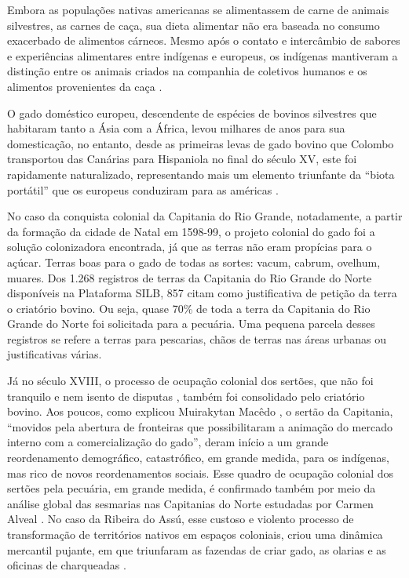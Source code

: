 \begin{refsection}
Embora as populações nativas americanas se alimentassem de carne de animais silvestres, as carnes de caça, sua dieta alimentar não era baseada no consumo exacerbado de alimentos cárneos. Mesmo após o contato e intercâmbio de sabores e experiências alimentares entre indígenas e europeus, os indígenas mantiveram a distinção entre os animais criados na companhia de coletivos humanos e os alimentos provenientes da caça \cite{Velden2019tratados}.

O gado doméstico europeu, descendente de espécies de bovinos silvestres que habitaram tanto a Ásia com a África, levou milhares de anos para sua domesticação, no entanto, desde as primeiras levas de gado bovino que Colombo transportou das Canárias para Hispaniola no final do século XV, este foi rapidamente naturalizado, representando mais um elemento triunfante da ``biota portátil'' que os europeus conduziram para as américas \cite{Crosby1993imperialismo}.

No caso da conquista colonial da Capitania do Rio Grande, notadamente, a partir da formação da cidade de Natal em 1598-99, o projeto colonial do gado foi a solução colonizadora encontrada, já que as terras não eram propícias para o açúcar. Terras boas para o gado de todas as sortes: vacum, cabrum, ovelhum, muares. Dos 1.268 registros de terras da Capitania do Rio Grande do Norte disponíveis na Plataforma SILB, 857 citam como justificativa de petição da terra o criatório bovino. Ou seja, quase 70\% de toda a terra da Capitania do Rio Grande do Norte foi solicitada para a pecuária. Uma pequena parcela desses registros se refere a terras para pescarias, chãos de terras nas áreas urbanas ou justificativas várias.

Já no século XVIII, o processo de ocupação colonial dos sertões, que não foi tranquilo e nem isento de disputas \cites{Araujo2007}{Alencar2017}, também foi consolidado pelo criatório bovino. Aos poucos, como explicou Muirakytan Macêdo \citeyear{Macedo2007rusticos}, o sertão da Capitania, “movidos pela abertura de fronteiras que possibilitaram a animação do mercado interno com a comercialização do gado”, deram início a um grande reordenamento demográfico, catastrófico, em grande medida, para os indígenas, mas rico de novos reordenamentos sociais. Esse quadro de ocupação colonial dos sertões pela pecuária, em grande medida, é confirmado também por meio da análise global das sesmarias nas Capitanias do Norte estudadas por Carmen Alveal \citeyear{Alveal2019}. No caso da Ribeira do Assú, esse custoso e violento processo de transformação de territórios nativos em espaços coloniais, criou uma dinâmica mercantil pujante, em que triunfaram as fazendas de criar gado, as olarias e as oficinas de charqueadas \cite{Silva2015}.


\end{refsection}
